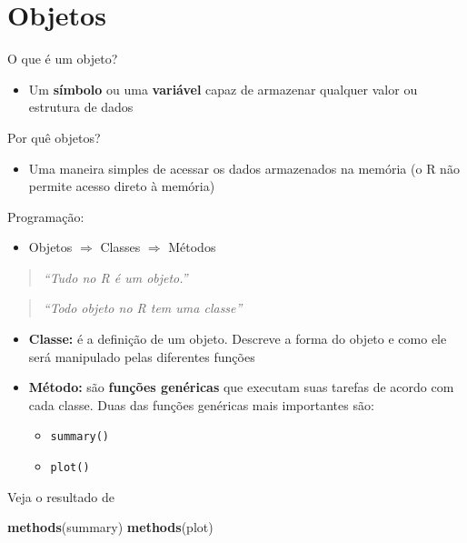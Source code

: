 \documentclass[10pt,a4paper]{book}
\newenvironment{Shaded}{\begin{snugshade}}{\end{snugshade}}
\newcommand{\KeywordTok}[1]{\textcolor[rgb]{0.13,0.29,0.53}{\textbf{#1}}}
\newcommand{\NormalTok}[1]{#1}
\providecommand{\tightlist}{%
  \setlength{\itemsep}{0pt}\setlength{\parskip}{0pt}}
\begin{document}
\section{Objetos}\label{objetos}

O que é um objeto?

\begin{itemize}
\tightlist
\item
  Um \textbf{símbolo} ou uma \textbf{variável} capaz de armazenar
  qualquer valor ou estrutura de dados
\end{itemize}

Por quê objetos?

\begin{itemize}
\tightlist
\item
  Uma maneira simples de acessar os dados armazenados na memória (o R
  não permite acesso direto à memória)
\end{itemize}

Programação:

\begin{itemize}
\tightlist
\item
  Objetos \(\Rightarrow\) Classes \(\Rightarrow\) Métodos
\end{itemize}

\begin{quote}
\emph{``Tudo no R é um objeto.''}
\end{quote}

\begin{quote}
\emph{``Todo objeto no R tem uma classe''}
\end{quote}

\begin{itemize}
\tightlist
\item
  \textbf{Classe:} é a definição de um objeto. Descreve a forma do
  objeto e como ele será manipulado pelas diferentes funções
\item
  \textbf{Método:} são \textbf{funções genéricas} que executam suas
  tarefas de acordo com cada classe. Duas das funções genéricas mais
  importantes são:

  \begin{itemize}
  \tightlist
  \item
    \texttt{summary()}
  \item
    \texttt{plot()}
  \end{itemize}
\end{itemize}

Veja o resultado de

\begin{Shaded}
\begin{Highlighting}[]
\KeywordTok{methods}\NormalTok{(summary)}
\KeywordTok{methods}\NormalTok{(plot)}
\end{Highlighting}
\end{Shaded}
\end{document}
